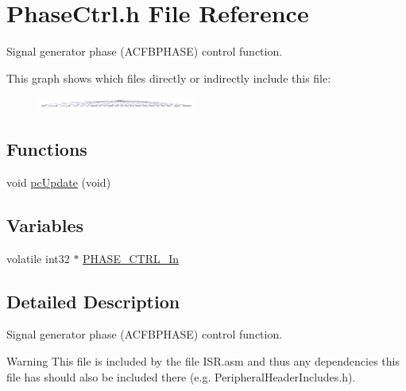 \hypertarget{a00020}{\section{Phase\-Ctrl.\-h File Reference}
\label{a00020}
}


Signal generator phase (A\-C\-F\-B\-P\-H\-A\-S\-E) control function.  


This graph shows which files directly or indirectly include this file\-:
\nopagebreak
\begin{figure}[H]
\begin{center}
\leavevmode
\includegraphics[width=148pt]{a00047}
\end{center}
\end{figure}
\subsection*{Functions}
\begin{DoxyCompactItemize}
\item 
void \hyperlink{a00020_a2aab767cee769a114c9e2ab25771e447}{pc\-Update} (void)
\end{DoxyCompactItemize}
\subsection*{Variables}
\begin{DoxyCompactItemize}
\item 
volatile int32 $\ast$ \hyperlink{a00020_ac286d0874ebba5141e36971f4a7f106e}{P\-H\-A\-S\-E\-\_\-\-C\-T\-R\-L\-\_\-\-In}
\end{DoxyCompactItemize}


\subsection{Detailed Description}
Signal generator phase (A\-C\-F\-B\-P\-H\-A\-S\-E) control function. \begin{DoxyWarning}{Warning}
This file is included by the file I\-S\-R.\-asm and thus any dependencies this file has should also be included there (e.\-g. Peripheral\-Header\-Includes.\-h). 
\end{DoxyWarning}


